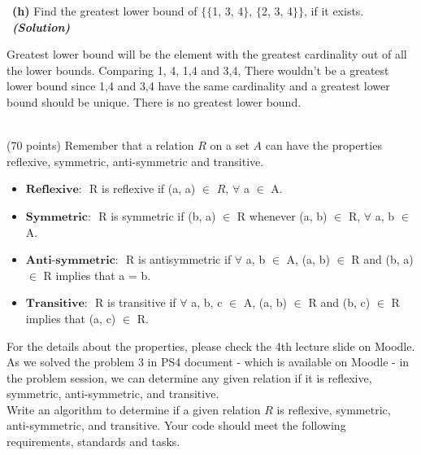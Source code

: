 \documentclass[a4 paper]{article}
\numberwithin{equation}{section}
\newcommand{\problem}[2]{~\\\fbox{\textbf{Problem #1}}\hfill (#2 points)\newline\newline}
\newcommand{\subproblem}[1]{~\newline\textbf{(#1)}}
\newcommand{\solution}{~\newline\textbf{\textit{(Solution)}} }
\newcommand{\0}{\mathbf{0}}
\begin{document}
\subproblem{h} Find the greatest lower bound of $\{\{$1, 3, 4$\}$, $\{$2, 3, 4$\}\}$,
if it exists.
\solution

Greatest lower bound will be the element with the greatest cardinality out of all the lower bounds. Comparing {1}, {4}, {1,4} and {3,4}, There wouldn't be a greatest lower bound since {1,4} and {3,4} have the same cardinality and a greatest lower bound should be unique. There is no greatest lower bound.

\problem{3: Relations}{70}
Remember that a relation $R$ on a set $A$ can have the properties reflexive, symmetric, anti-symmetric and transitive.

\begin{itemize}
	\item $\textbf{Reflexive: }$ R is reflexive if (a, a) $\in$ $R$, $\forall$ a $\in$ A.
	\item $\textbf{Symmetric: }$ R is symmetric if (b, a) $\in$ R whenever (a, b) $\in$ R, $\forall$ a, b $\in$ A.
	\item $\textbf{Anti-symmetric: }$ R is antisymmetric if $\forall$ a, b $\in$ A, (a, b) $\in$ R and (b, a) $\in$ R implies that a = b.
	\item $\textbf{Transitive: }$ R is transitive if $\forall$ a, b, c $\in$ A, (a, b) $\in$ R and (b, c) $\in$ R implies that (a, c) $\in$ R.
\end{itemize}
For the details about the properties, please check the 4th lecture slide on Moodle. \\

As we solved the problem 3 in PS4 document - which is available on Moodle - in the problem session, we can determine any given relation if it is reflexive, symmetric, anti-symmetric, and transitive.\\

Write an algorithm to determine if a given relation $R$ is reflexive, symmetric, anti-symmetric, and transitive. Your code should meet the following requirements, standards and tasks.
\end{document}
